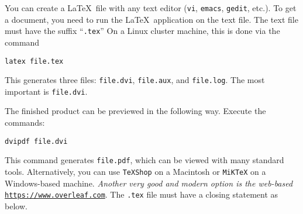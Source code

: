 \documentclass{article}
\begin{document}
\medskip
{}
\medskip

You can create a \LaTeX~file with any text editor ({\tt vi}, {\tt emacs}, {\tt gedit}, 
etc.). 
To get a document, you need to run the \LaTeX~application
on the text file.  The text file must have the suffix ``{\tt .tex}''
On a Linux cluster machine, this is done via the command

\medskip
{\tt latex file.tex}

\medskip
\noindent
This generates three files: {\tt file.dvi}, {\tt file.aux},
and {\tt file.log}.  The most important is {\tt file.dvi}. 

\medskip
\noindent
The finished product can be previewed in the following way.
Execute the commands:

\medskip

{\tt dvipdf file.dvi}\hspace{1.9in}{\em Linux System}

\medskip
\noindent
This command generates {\tt file.pdf}, which can be viewed with many standard tools.
Alternatively, you can use {\tt TeXShop} on a Macintosh or {\tt MiKTeX} on a Windows-based machine. {\em Another very good and modern option is the web-based} \href{https://www.overleaf.com}{\tt https://www.overleaf.com}.
The {\tt .tex} file must have a closing statement as
below.
\end{document}
